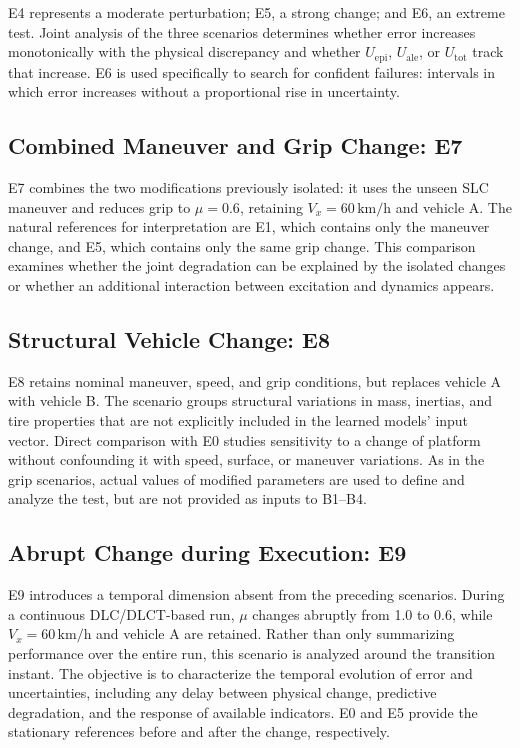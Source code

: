 \documentclass[12pt,a4paper]{report}
\begin{document}
E4 represents a moderate perturbation; E5, a strong change; and E6, an extreme test. Joint analysis of the three scenarios determines whether error increases monotonically with the physical discrepancy and whether $U_{\mathrm{epi}}$, $U_{\mathrm{ale}}$, or $U_{\mathrm{tot}}$ track that increase. E6 is used specifically to search for confident failures: intervals in which error increases without a proportional rise in uncertainty.

\subsection{Combined Maneuver and Grip Change: E7}

E7 combines the two modifications previously isolated: it uses the unseen SLC maneuver and reduces grip to $\mu=0.6$, retaining $V_x=60\,\mathrm{km/h}$ and vehicle A. The natural references for interpretation are E1, which contains only the maneuver change, and E5, which contains only the same grip change. This comparison examines whether the joint degradation can be explained by the isolated changes or whether an additional interaction between excitation and dynamics appears.

\subsection{Structural Vehicle Change: E8}

E8 retains nominal maneuver, speed, and grip conditions, but replaces vehicle A with vehicle B. The scenario groups structural variations in mass, inertias, and tire properties that are not explicitly included in the learned models' input vector. Direct comparison with E0 studies sensitivity to a change of platform without confounding it with speed, surface, or maneuver variations. As in the grip scenarios, actual values of modified parameters are used to define and analyze the test, but are not provided as inputs to B1--B4.

\subsection{Abrupt Change during Execution: E9}

E9 introduces a temporal dimension absent from the preceding scenarios. During a continuous DLC/DLCT-based run, $\mu$ changes abruptly from 1.0 to 0.6, while $V_x=60\,\mathrm{km/h}$ and vehicle A are retained. Rather than only summarizing performance over the entire run, this scenario is analyzed around the transition instant. The objective is to characterize the temporal evolution of error and uncertainties, including any delay between physical change, predictive degradation, and the response of available indicators. E0 and E5 provide the stationary references before and after the change, respectively.
\end{document}
